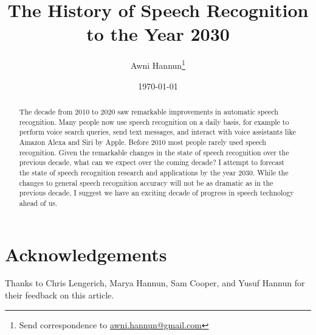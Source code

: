 \documentclass[twocolumn, 12pt]{article}
\title{The History of Speech Recognition to the Year 2030}
\author{Awni Hannun\footnote{
  Send correspondence to
  \href{mailto:awni.hannun@gmail.com}{awni.hannun@gmail.com}}}
\date{\today}
\begin{document}
\maketitle

\begin{abstract}
    The decade from 2010 to 2020 saw remarkable improvements in automatic
    speech recognition. Many people now use speech recognition on a daily
    basis, for example to perform voice search queries, send text messages, and
    interact with voice assistants like Amazon Alexa and Siri by Apple. Before
    2010 most people rarely used speech recognition. Given the remarkable
    changes in the state of speech recognition over the previous decade, what
    can we expect over the coming decade? I attempt to forecast the state of
    speech recognition research and applications by the year 2030. While the
    changes to general speech recognition accuracy will not be as dramatic as
    in the previous decade, I suggest we have an exciting decade of progress in
    speech technology ahead of us.
\end{abstract}







\section*{\large Acknowledgements}

Thanks to Chris Lengerich, Marya Hannun, Sam Cooper, and Yusuf Hannun for their
feedback on this article.



\end{document}
